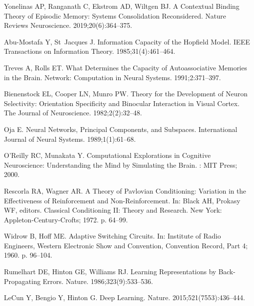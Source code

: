 \documentclass[10pt,letterpaper]{article}
\begin{document}
\begin{thebibliography}{10}
  Yonelinas AP, Ranganath C, Ekstrom AD, Wiltgen BJ.
  \newblock A Contextual Binding Theory of Episodic Memory: Systems Consolidation
    Reconsidered.
  \newblock Nature Reviews Neuroscience. 2019;20(6):364--375.
  
  {Abu-Mostafa} Y, St~Jacques J.
  \newblock Information Capacity of the {{Hopfield}} Model.
  \newblock IEEE Transactions on Information Theory. 1985;31(4):461--464.
  
  Treves A, Rolls ET.
  \newblock What {{Determines}} the {{Capacity}} of {{Autoassociative Memories}}
    in the {{Brain}}.
  \newblock Network: Computation in Neural Systems. 1991;2:371--397.
  
  Bienenstock EL, Cooper LN, Munro PW.
  \newblock Theory for the Development of Neuron Selectivity: {{Orientation}}
    Specificity and Binocular Interaction in Visual Cortex.
  \newblock The Journal of Neuroscience. 1982;2(2):32--48.
  
  Oja E.
  \newblock Neural Networks, Principal Components, and Subspaces.
  \newblock International Journal of Neural Systems. 1989;1(1):61--68.
  
  O'Reilly RC, Munakata Y.
  \newblock Computational {{Explorations}} in {{Cognitive Neuroscience}}:
    {{Understanding}} the {{Mind}} by {{Simulating}} the {{Brain}}.
  : {MIT Press}; 2000.
  
  Rescorla RA, Wagner AR.
  \newblock A Theory of {{Pavlovian}} Conditioning: {{Variation}} in the
    Effectiveness of Reinforcement and Non-Reinforcement.
  \newblock In: Black AH, Prokasy WF, editors. Classical {{Conditioning II}}:
    {{Theory}} and {{Research}}. {New York}: {Appleton-Century-Crofts}; 1972. p.
    64--99.
  
  Widrow B, Hoff ME.
  \newblock Adaptive {{Switching Circuits}}.
  \newblock In: Institute of {{Radio Engineers}}, {{Western Electronic Show}} and
    {{Convention}}, {{Convention Record}}, {{Part}} 4; 1960. p. 96--104.
  
  Rumelhart DE, Hinton GE, Williams RJ.
  \newblock Learning Representations by Back-Propagating Errors.
  \newblock Nature. 1986;323(9):533--536.
  
  LeCun Y, Bengio Y, Hinton G.
  \newblock Deep Learning.
  \newblock Nature. 2015;521(7553):436--444.
  

\end{thebibliography}
\end{document}
